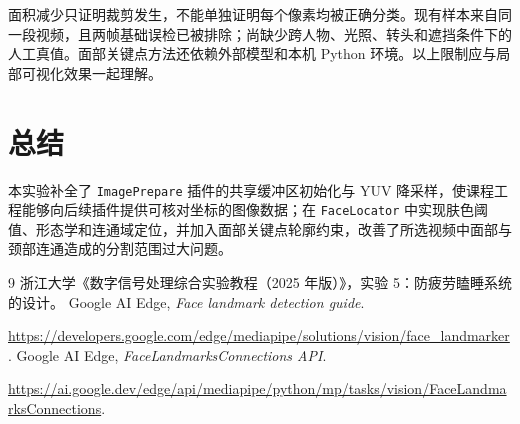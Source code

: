 \documentclass[UTF8,a4paper,12pt,fontset=windows]{ctexart}
\begin{document}
面积减少只证明裁剪发生，不能单独证明每个像素均被正确分类。现有样本来自同一段视频，且两帧基础误检已被排除；尚缺少跨人物、光照、转头和遮挡条件下的人工真值。面部关键点方法还依赖外部模型和本机 Python 环境。以上限制应与局部可视化效果一起理解。

\section{总结}
本实验补全了 \texttt{ImagePrepare} 插件的共享缓冲区初始化与 YUV 降采样，使课程工程能够向后续插件提供可核对坐标的图像数据；在 \texttt{FaceLocator} 中实现肤色阈值、形态学和连通域定位，并加入面部关键点轮廓约束，改善了所选视频中面部与颈部连通造成的分割范围过大问题。

\begin{thebibliography}{9}
   浙江大学《数字信号处理综合实验教程（2025 年版）》，实验 5：防疲劳瞌睡系统的设计。
   Google AI Edge, \emph{Face landmark detection guide}.\par
  \url{https://developers.google.com/edge/mediapipe/solutions/vision/face_landmarker}.
   Google AI Edge, \emph{FaceLandmarksConnections API}.\par
  \url{https://ai.google.dev/edge/api/mediapipe/python/mp/tasks/vision/FaceLandmarksConnections}.
\end{thebibliography}
\end{document}
